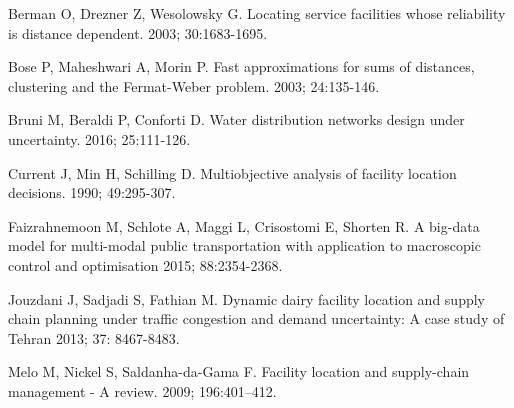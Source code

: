 \documentclass[twoside,twocolumn]{article}
\begin{document}

\begin{thebibliography}{99} %

Berman O, Drezner Z, Wesolowsky G.
\newblock Locating service facilities whose reliability is distance dependent.
 2003; 30:1683-1695.

Bose P, Maheshwari A, Morin P.
\newblock Fast approximations for sums of distances, clustering and the Fermat-Weber problem.
 2003; 24:135-146.

Bruni M, Beraldi P, Conforti D.
\newblock Water distribution networks design under uncertainty.
 2016; 25:111-126.

Current J, Min H, Schilling D.
\newblock Multiobjective analysis of facility location decisions.
 1990; 49:295-307.

Faizrahnemoon M, Schlote A, Maggi L, Crisostomi E, Shorten R.
\newblock A big-data model for multi-modal public transportation with application to macroscopic control and optimisation
 2015; 88:2354-2368.

Jouzdani J, Sadjadi S, Fathian M.
\newblock Dynamic dairy facility location and supply chain planning under traffic congestion and demand uncertainty: A case study of Tehran
 2013; 37: 8467-8483.

Melo M, Nickel S, Saldanha-da-Gama F.
\newblock Facility location and supply-chain management - A review.
  2009; 196:401--412.


\end{thebibliography}
\end{document}

